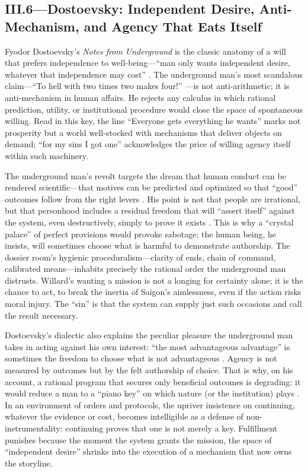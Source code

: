 \subsection*{III.6—Dostoevsky: Independent Desire, Anti-Mechanism, and Agency That Eats Itself}
\label{ssec:iii-dostoevsky}
Fyodor Dostoevsky's \emph{Notes from Underground} is the classic anatomy of a will that prefers
independence to well-being—``man only wants independent desire, whatever that independence may
cost'' \parencite[p.~131]{DostoevskyNFU1994}. The underground man's most scandalous claim—``To
hell with two times two makes four!'' \parencite[p.~129]{DostoevskyNFU1994}—is not
anti-arithmetic; it is anti-mechanism in human affairs. He rejects any calculus in which
rational prediction, utility, or institutional procedure would close the space of spontaneous
willing. Read in this key, the line ``Everyone gets everything he wants'' marks not prosperity
but a world well-stocked with mechanisms that deliver objects on demand; ``for my sins I got
one'' acknowledges the price of willing agency itself within such machinery.

The underground man's revolt targets the dream that human conduct can be rendered scientific—that
motives can be predicted and optimized so that ``good'' outcomes follow from the right levers
\parencite[pp.~120--132]{DostoevskyNFU1994}. His point is not that people are irrational, but
that personhood includes a residual freedom that will ``assert itself'' against the system,
even destructively, simply to prove it exists \parencite[pp.~129--132]{DostoevskyNFU1994}.
This is why a ``crystal palace'' of perfect provisions would provoke sabotage; the human being,
he insists, will sometimes choose what is harmful to demonstrate authorship. The dossier room's
hygienic proceduralism—clarity of ends, chain of command, calibrated means—inhabits precisely
the rational order the underground man distrusts. Willard's wanting a mission is not a longing
for certainty alone; it is the chance to act, to break the inertia of Saigon's aimlessness,
even if the action risks moral injury. The ``sin'' is that the system can supply just such
occasions and call the result necessary.

Dostoevsky's dialectic also explains the peculiar pleasure the underground man takes in acting
against his own interest: ``the most advantageous advantage'' is sometimes the freedom to choose
what is not advantageous \parencite[pp.~129--131]{DostoevskyNFU1994}. Agency is not measured by
outcomes but by the felt authorship of choice. That is why, on his account, a rational program
that secures only beneficial outcomes is degrading: it would reduce a man to a ``piano key'' on
which nature (or the institution) plays \parencite[pp.~115--120]{DostoevskyNFU1994}.
In an environment of orders and protocols, the upriver insistence on continuing, whatever the
evidence or cost, becomes intelligible as a defense of non-instrumentality: continuing proves
that one is not merely a key. Fulfillment punishes because the moment the system grants the
mission, the space of ``independent desire'' shrinks into the execution of a mechanism that
now owns the storyline.

